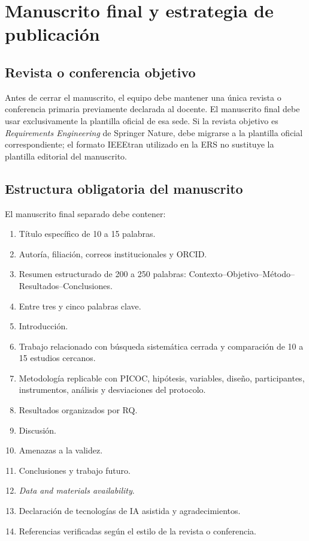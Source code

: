 \documentclass[12pt,journal,onecolumn]{IEEEtran}
\begin{document}
\section{Manuscrito final y estrategia de publicación}
\label{sec:publicacion2b}

\subsection{Revista o conferencia objetivo}

Antes de cerrar el manuscrito, el equipo debe mantener una única revista o
conferencia primaria previamente declarada al docente. El manuscrito final debe
usar exclusivamente la plantilla oficial de esa sede. Si la revista objetivo
es \emph{Requirements Engineering} de Springer Nature, debe migrarse a la
plantilla oficial correspondiente; el formato IEEEtran utilizado en la ERS no
sustituye la plantilla editorial del manuscrito.

\subsection{Estructura obligatoria del manuscrito}

El manuscrito final separado debe contener:

\begin{enumerate}
    \item Título específico de 10 a 15 palabras.
    \item Autoría, filiación, correos institucionales y ORCID.
    \item Resumen estructurado de 200 a 250 palabras:
          Contexto--Objetivo--Método--Resultados--Conclusiones.
    \item Entre tres y cinco palabras clave.
    \item Introducción.
    \item Trabajo relacionado con búsqueda sistemática cerrada y comparación
          de 10 a 15 estudios cercanos.
    \item Metodología replicable con PICOC, hipótesis, variables, diseño,
          participantes, instrumentos, análisis y desviaciones del protocolo.
    \item Resultados organizados por RQ.
    \item Discusión.
    \item Amenazas a la validez.
    \item Conclusiones y trabajo futuro.
    \item \emph{Data and materials availability}.
    \item Declaración de tecnologías de IA asistida y agradecimientos.
    \item Referencias verificadas según el estilo de la revista o conferencia.
\end{enumerate}
\end{document}
